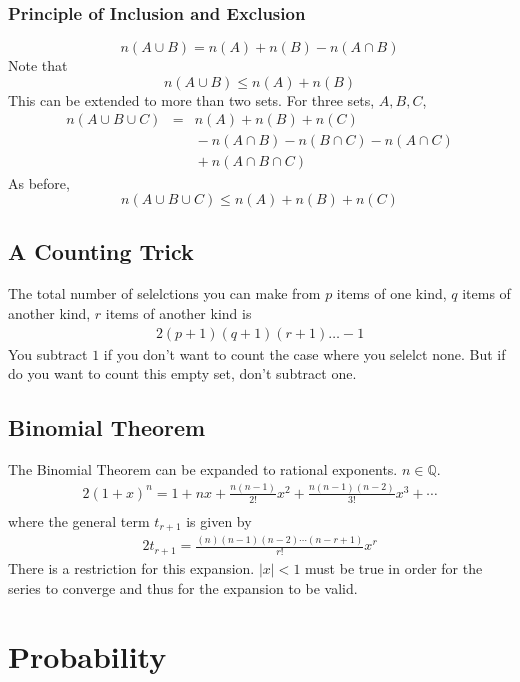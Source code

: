\documentclass[letterpaper, 12pt]{report}
\theoremstyle{definition}
\numberwithin{equation}{section}
\begin{document}
\subsubsection{Principle of Inclusion and Exclusion}
\begin{equation}
	n(A \cup B) = n(A) + n(B) - n(A \cap B)
\end{equation}
Note that
\begin{equation}
	n(A \cup B) \le n(A) + n(B)
\end{equation}
This can be extended to more than two sets. For three sets, $A, B, C$,
\begin{eqnarray}
	n(A \cup B \cup C) & = & n(A) + n(B) + n(C) \nonumber \\
	& & {} - n(A \cap B) - n(B \cap C) - n(A \cap C) \nonumber \\
	& & {} + n(A \cap B \cap C)
\end{eqnarray}
As before,
\begin{equation}
	n(A \cup B \cup C) \le n(A) + n(B) + n(C)
\end{equation}

\subsection{A Counting Trick}
The total number of selelctions you can make from $p$ items of one kind, $q$ items of another kind, $r$ items of another kind is
\begin{alignat}{2}{}
	(p+1)(q+1)(r+1)\dots - 1
\end{alignat}
You subtract $1$ if you don't want to count the case where you selelct none. But if do you want to count this empty set, don't subtract one.
\subsection{Binomial Theorem}
The Binomial Theorem can be expanded to rational exponents. $n \in \mathbb{Q}$.
\begin{alignat}{2}{}
	(1+x)^n = 1 + nx + \frac{n(n-1)}{2!}x^2 + \frac{n(n-1)(n-2)}{3!}x^3 + \cdots \\
\end{alignat}
where the general term $t_{r+1}$ is given by
\begin{alignat}{2}
	t_{r+1} = \frac{(n)(n-1)(n-2)\cdots(n-r+1)}{r!} x^r
\end{alignat}
There is a restriction for this expansion. $|x| < 1$ must be true in order for the series to converge and thus for the expansion to be valid.
\section{Probability}
\end{document}
